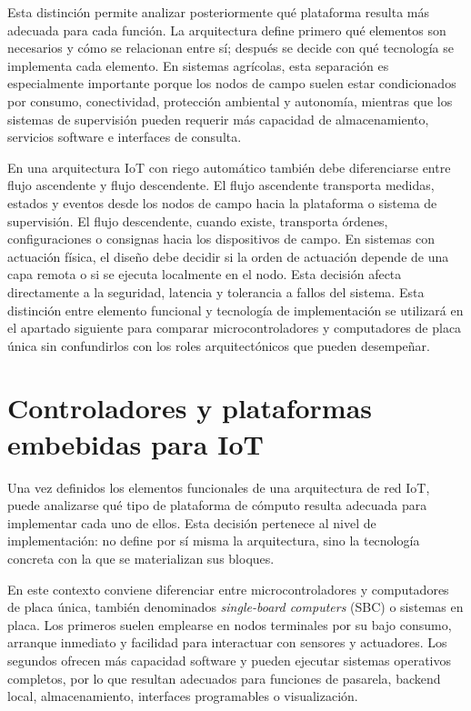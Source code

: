 \normalsize
\endgroup

Esta distinción permite analizar posteriormente qué plataforma resulta más adecuada para cada función. La arquitectura define primero qué elementos son necesarios y cómo se relacionan entre sí; después se decide con qué tecnología se implementa cada elemento. En sistemas agrícolas, esta separación es especialmente importante porque los nodos de campo suelen estar condicionados por consumo, conectividad, protección ambiental y autonomía, mientras que los sistemas de supervisión pueden requerir más capacidad de almacenamiento, servicios software e interfaces de consulta.

En una arquitectura IoT con riego automático también debe diferenciarse entre flujo ascendente y flujo descendente. El flujo ascendente transporta medidas, estados y eventos desde los nodos de campo hacia la plataforma o sistema de supervisión. El flujo descendente, cuando existe, transporta órdenes, configuraciones o consignas hacia los dispositivos de campo. En sistemas con actuación física, el diseño debe decidir si la orden de actuación depende de una capa remota o si se ejecuta localmente en el nodo. Esta decisión afecta directamente a la seguridad, latencia y tolerancia a fallos del sistema. Esta distinción entre elemento funcional y tecnología de implementación se utilizará en el apartado siguiente para comparar microcontroladores y computadores de placa única sin confundirlos con los roles arquitectónicos que pueden desempeñar.

\section{Controladores y plataformas embebidas para IoT}
\label{sec:controladores_plataformas_embebidas}

Una vez definidos los elementos funcionales de una arquitectura de red IoT, puede analizarse qué tipo de plataforma de cómputo resulta adecuada para implementar cada uno de ellos. Esta decisión pertenece al nivel de implementación: no define por sí misma la arquitectura, sino la tecnología concreta con la que se materializan sus bloques.

En este contexto conviene diferenciar entre microcontroladores y computadores de placa única, también denominados \textit{single-board computers} (SBC) o sistemas en placa. Los primeros suelen emplearse en nodos terminales por su bajo consumo, arranque inmediato y facilidad para interactuar con sensores y actuadores. Los segundos ofrecen más capacidad software y pueden ejecutar sistemas operativos completos, por lo que resultan adecuados para funciones de pasarela, backend local, almacenamiento, interfaces programables o visualización.

